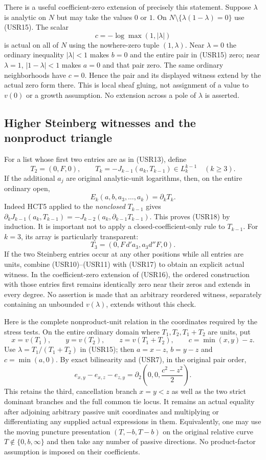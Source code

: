 There is a useful coefficient-zero extension of precisely this
statement.  Suppose $\lambda$ is analytic on $N$ but may take the
values $0$ or $1$.  On $N\setminus\{\lambda(1-\lambda)=0\}$
use (USR15).  The scalar
\[
                        c=-\log\max(1,|\lambda|)
 \tag{USR16}
\]
is actual on all of $N$ using the nowhere-zero tuple $(1,\lambda)$.
Near $\lambda=0$ the ordinary inequality $|\lambda|<1$ makes
$b=0$ and the entire pair in (USR15) zero; near $\lambda=1$,
$|1-\lambda|<1$ makes $a=0$ and that pair zero.  The same
ordinary neighborhoods have $c=0$.  Hence the pair and its
displayed witness extend by the actual zero form there.  This is
local sheaf gluing, not assignment of a value to $v(0)$ or a
growth assumption.  No extension across a pole of $\lambda$ is
asserted.

\subsection{Higher Steinberg witnesses and the nonproduct triangle}

For a list whose first two entries are as in (USR13), define
\[
 T_2=(0,F,0),\qquad
 T_k=-J_{k-1}(a_k,T_{k-1})\in L_k^{k-1}\quad(k\ge3).
 \tag{USR17}
\]
If the additional $a_j$ are original analytic-unit logarithms,
then, on the entire ordinary open,
\[
                       E_k(a,b,a_3,\ldots,a_k)=\partial_kT_k.
 \tag{USR18}
\]
Indeed HCT5 applied to the \emph{nonclosed} $T_{k-1}$ gives
$\partial_kJ_{k-1}(a_k,T_{k-1})=-J_{k-2}(a_k,\partial_{k-1}T_{k-1})$.
This proves (USR18) by induction.  It is important not to apply
a closed-coefficient-only rule to $T_{k-1}$.
For $k=3$, its array is particularly transparent:
\[
                      T_3=(0,F\,d'a_3,a_3d''F,0).
 \tag{USR19}
\]
If the two Steinberg entries occur at any other positions while
all entries are units, combine (USR10)--(USR11) with (USR17)
to obtain an explicit actual witness.  In the coefficient-zero
extension of (USR16), the ordered construction with those entries
first remains identically zero near their zeros and extends in
every degree.  No assertion is made that an arbitrary reordered
witness, separately containing an unbounded $v(\lambda)$, extends
without this check.

Here is the complete nonproduct-unit relation in the coordinates
required by the stress tests.  On the entire ordinary domain where
$T_1,T_2,T_1+T_2$ are units, put
\[
 x=v(T_1),\qquad y=v(T_2),\qquad z=v(T_1+T_2),\qquad
                            c=\min(x,y)-z.
 \tag{USR20}
\]
Use $\lambda=T_1/(T_1+T_2)$ in (USR15); then
$a=x-z$, $b=y-z$ and $c=\min(a,0)$.
By exact bilinearity and (USR7), in the original pair order,
\[
 e_{x,y}-e_{x,z}-e_{z,y}
       =\partial_2\left(0,0,\frac{c^2-z^2}{2}\right).
 \tag{USR21}
\]
This retains the third, cancellation branch $x=y<z$ as well as
the two strict dominant branches and the full common tie locus.
It remains an actual equality after adjoining arbitrary passive
unit coordinates and multiplying or differentiating any supplied
actual expressions in them.  Equivalently, one may use the moving
puncture presentation $(T,-b,T-b)$ on the original relative curve
$T\notin\{0,b,\infty\}$ and then take any number of passive
directions.  No product-factor assumption is imposed on their
coefficients.

